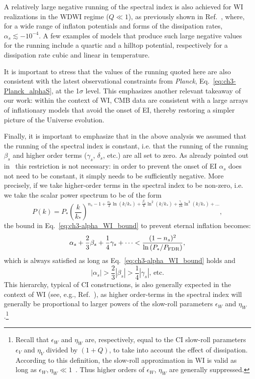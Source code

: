 A relatively large negative running
of the spectral index is also achieved for WI realizations in the WDWI
regime ($Q\ll1$), as previously shown in Ref.~\cite{Benetti:2016jhf},
where, for a wide range of inflaton potentials  and forms of the
dissipation rates, $\alpha_s\lesssim-10^{-4}$. A few examples of models that produce such large negative values for the running include a quartic and a hilltop potential, respectively for a dissipation rate cubic and linear in temperature.

It is important to
stress that the values of the running quoted here are also consistent
with the latest observational constraints from \textit{Planck},
Eq.~\ref{eq:ch3-Planck_alphaS}, at the 1$\sigma$ level. This emphasizes another relevant takeaway of our work: within the context of WI, CMB data are consistent with a large
arrays of inflationary models that avoid the onset of EI, thereby
restoring a simpler picture of the Universe evolution.

Finally, it is important to emphasize that in the above analysis we assumed that the running of the spectral
index is constant, i.e. that the running of the running $\beta_s$ and
higher order terms ($\gamma_s$, $\delta_s$, etc.) are all set to
zero. As already pointed out in~\cite{Kinney:2014jya} this restriction
is not necessary: in order to prevent the onset of EI $\alpha_s$ does
not need to be constant, it simply needs to be sufficiently
negative. More precisely, if we take higher-order terms in the
spectral index to be non-zero, i.e. we take the scalar power spectrum to be of the form
\begin{equation}
    P(k)=P_*\left(\frac{k}{k_*}\right)^{n_s-1+\frac{\alpha_s}{2}\ln(k/k_*)+\frac{\beta_s}{6}\ln^2(k/k_*)+\frac{\gamma_s}{24}\ln^3(k/k_*)+\dots},
\end{equation}
the bound in
Eq.~\ref{eq:ch3-alpha_WI_bound} to prevent eternal inflation
becomes:
\begin{equation}
\alpha_s+\frac{2}{3}\beta_s+\frac{1}{4}\gamma_s+\cdots <
\frac{(1-n_s)^2}{\ln\left(P_*/P_{\rm{FDR}}\right)},
\end{equation}
%
which is always satisfied as long as Eq.~\ref{eq:ch3-alpha_WI_bound}
holds and
\begin{equation}
    |\alpha_s|>\frac{2}{3}|\beta_s|>\frac{1}{4}|\gamma_s|,\,\text{etc.}
\end{equation}
 This hierarchy, typical of CI constructions, is also generally
expected in the context of WI (see, e.g., Ref.~\cite{Das:2022ubr}), as
higher order-terms in the spectral index will generally be
proportional to larger powers of the slow-roll parameters $\epsilon_W$
and $\eta_W$.\footnote{Recall that $\epsilon_W$ and $\eta_W$ are,
respectively, equal to the CI slow-roll parameters $\epsilon_V$ and
$\eta_V$ divided by $(1+Q)$, to take into account the effect of
dissipation. According to this definition, the slow-roll approximation
in WI is valid as long as   $\epsilon_W,\eta_W \ll
1$~\cite{Berera:2008ar}. Thus higher orders of $\epsilon_W$, $\eta_W$
are generally suppressed.}

